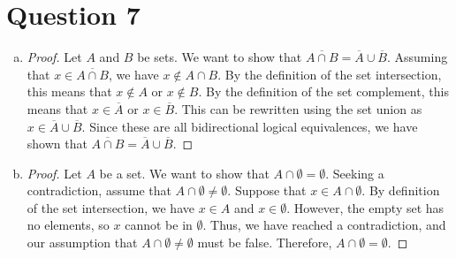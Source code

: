 \documentclass{article}
\begin{document}
\section*{Question 7}
\begin{enumerate}[(a)]
    \item
        \begin{proof}
            Let $A$ and $B$ be sets.
            We want to show that $\overline{A \cap B} = \overline{A} \cup \overline{B}$.
            Assuming that $x \in \overline{A \cap B}$, we have $x \notin A \cap B$.
            By the definition of the set intersection, this means that $x \notin A$ or $x \notin B$.
            By the definition of the set complement, this means that $x \in \overline{A}$ or $x \in \overline{B}$.
            This can be rewritten using the set union as $x \in \overline{A} \cup \overline{B}$.
            Since these are all bidirectional logical equivalences, we have shown that $\overline{A \cap B} = \overline{A} \cup \overline{B}$.
        \end{proof}
    \item
        \begin{proof}
            Let $A$ be a set.
            We want to show that $A \cap \emptyset = \emptyset$.
            Seeking a contradiction, assume that $A \cap \emptyset \neq \emptyset$.
            Suppose that $x \in A \cap \emptyset$.
            By definition of the set intersection, we have $x \in A$ and $x \in \emptyset$.
            However, the empty set has no elements, so $x$ cannot be in $\emptyset$.
            Thus, we have reached a contradiction, and our assumption that $A \cap \emptyset \neq \emptyset$ must be false.
            Therefore, $A \cap \emptyset = \emptyset$.
        \end{proof}
\end{enumerate}
\end{document}
